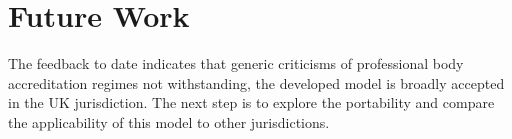 \documentclass[sigconf]{acmart}
\begin{document}
\section*{Future Work}
        
The feedback to date indicates that generic criticisms of professional
body accreditation regimes not withstanding, the developed model is
broadly accepted in the UK jurisdiction. The next step is to explore
the portability and compare the applicability of this model to other
jurisdictions.





%



% 
\end{document}
